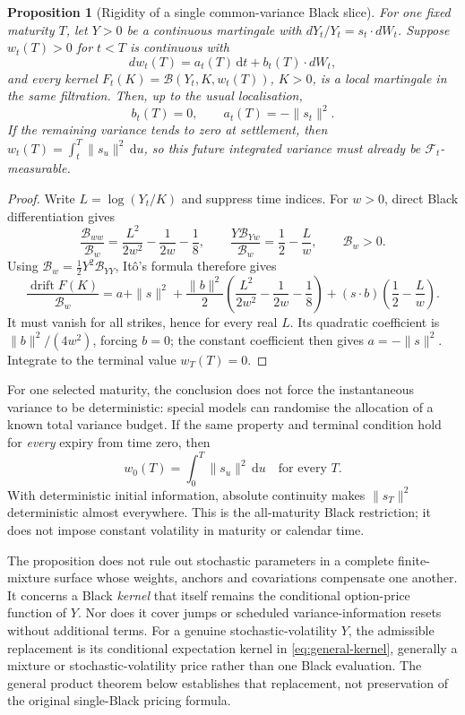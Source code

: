 \documentclass[11pt,a4paper]{article}
\numberwithin{equation}{section}
\newtheorem{proposition}[theorem]{Proposition}
\theoremstyle{definition}\newtheorem{definition}[theorem]{Definition}
\theoremstyle{remark}\newtheorem{remark}[theorem]{Remark}
\newcommand{\F}{\mathcal F}\newcommand{\G}{\mathcal G}
\newcommand{\dd}{\,\mathrm d}\newcommand{\dt}{\,\mathrm dt}
\newcommand{\Black}{\mathcal B}\newcommand{\LC}{\mathcal L}
\begin{document}
\begin{proposition}[Rigidity of a single common-variance Black slice]
\label{prop:black-rigidity}
For one fixed maturity $T$, let $Y>0$ be a continuous martingale with $dY_t/Y_t=s_t\cdot dW_t$. Suppose $w_t(T)>0$ for $t<T$ is continuous with
\[
 dw_t(T)=a_t(T)\dt+b_t(T)\cdot dW_t,
\]
and every kernel $F_t(K)=\Black(Y_t,K,w_t(T))$, $K>0$, is a local martingale in the same filtration. Then, up to the usual localisation,
\begin{equation}
 b_t(T)=0,\qquad a_t(T)=-\|s_t\|^2.
 \label{eq:black-rigidity-conclusion}
\end{equation}
If the remaining variance tends to zero at settlement, then
$w_t(T)=\int_t^T\|s_u\|^2\dd u$, so this future integrated variance must already be $\F_t$-measurable.
\end{proposition}
\begin{proof}
Write $L=\log(Y_t/K)$ and suppress time indices. For $w>0$, direct Black differentiation gives
\[
 \frac{\Black_{ww}}{\Black_w}
   =\frac{L^2}{2w^2}-\frac1{2w}-\frac18,
 \qquad
 \frac{Y\Black_{Yw}}{\Black_w}=\frac12-\frac Lw,
 \qquad \Black_w>0.
\]
Using $\Black_w=\tfrac12Y^2\Black_{YY}$, It\^o's formula therefore gives
\begin{equation}
 \frac{\operatorname{drift}F(K)}{\Black_w}
 =a+\|s\|^2
 +\frac{\|b\|^2}{2}
       \left(\frac{L^2}{2w^2}-\frac1{2w}-\frac18\right)
 +(s\cdot b)\left(\frac12-\frac Lw\right).
 \label{eq:black-polynomial}
\end{equation}
It must vanish for all strikes, hence for every real $L$. Its quadratic coefficient is $\|b\|^2/(4w^2)$, forcing $b=0$; the constant coefficient then gives $a=-\|s\|^2$. Integrate to the terminal value $w_T(T)=0$.
\end{proof}

For one selected maturity, the conclusion does not force the instantaneous variance to be deterministic: special models can randomise the allocation of a known total variance budget. If the same property and terminal condition hold for \emph{every} expiry from time zero, then
\[
 w_0(T)=\int_0^T\|s_u\|^2\dd u\quad\text{for every }T.
\]
With deterministic initial information, absolute continuity makes $\|s_T\|^2$ deterministic almost everywhere. This is the all-maturity Black restriction; it does not impose constant volatility in maturity or calendar time.

The proposition does not rule out stochastic parameters in a complete finite-mixture surface whose weights, anchors and covariations compensate one another. It concerns a Black \emph{kernel} that itself remains the conditional option-price function of $Y$. Nor does it cover jumps or scheduled variance-information resets without additional terms. For a genuine stochastic-volatility $Y$, the admissible replacement is its conditional expectation kernel in \eqref{eq:general-kernel}, generally a mixture or stochastic-volatility price rather than one Black evaluation. The general product theorem below establishes that replacement, not preservation of the original single-Black pricing formula.
\end{document}
